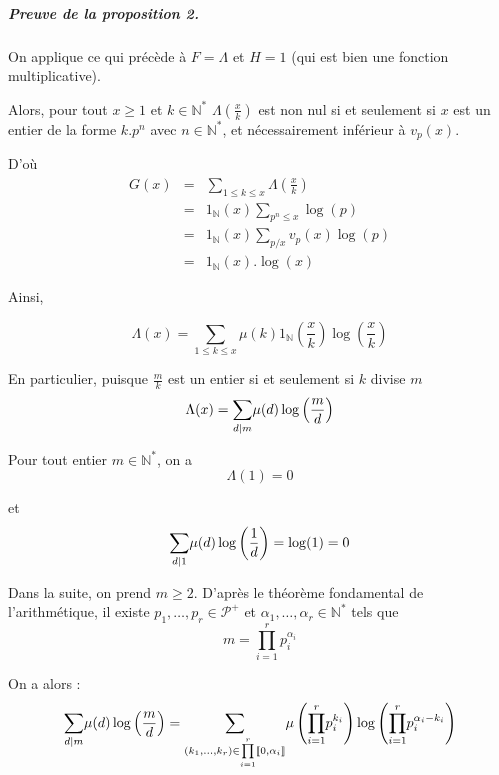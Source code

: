 \subparagraph{Preuve de la proposition 2.}


On applique ce qui pr{\'e}c{\`e}de {\`a} $F = \Lambda$ et $H = 1$ (qui est
bien une fonction multiplicative).

Alors, pour tout $x \geqslant 1$ et $k \in \mathbb{N}^{\ast}$ $\Lambda \left(
\frac{x}{k} \right)$ est non nul si et seulement si $x$ est un entier de la
forme $k.p^n$ avec $n \in \mathbb{N}^{\ast}$, et n{\'e}cessairement
inf{\'e}rieur {\`a} $v_p (x)$.

D'o{\`u}
\begin{eqnarray*}
  G (x) & = & \underset{1 \leqslant k \leqslant x}{\sum} \Lambda \left(
  \frac{x}{k} \right)\\
  & = & 1_{\mathbb{N}} (x) \underset{p^n \leqslant x}{\sum} \log (p)\\
  & = & 1_{\mathbb{N}} (x) \underset{p / x}{\sum} v_p (x) \log (p)\\
  & = & 1_{\mathbb{N}} (x) . \log (x)
\end{eqnarray*}


Ainsi,

\[  \]
\[ \Lambda (x) = \underset{1 \leqslant k \leqslant x}{\sum} \mu (k)
   1_{\mathbb{N}} \left( \frac{x}{k} \right) \log \left( \frac{x}{k} \right)
\]


En particulier, puisque $\frac{m}{k}$ est un entier si et seulement si $k$
divise $m$
\[ \Lambda (x) = \underset{d |  m}{\sum} \mu (d) \log \left(
   \frac{m}{d} \right) \]



Pour tout entier $m \in \mathbb{N}^{\ast}$, on a
\[ \Lambda (1) = 0 \]


et
\[ \underset{d |  1}{\sum} \mu (d) \log \left( \frac{1}{d} \right) =
   \log (1) = 0 \]


Dans la suite, on prend $m \geqslant 2$. D'apr{\`e}s le th{\'e}or{\`e}me
fondamental de l'arithm{\'e}tique, il existe $p_1, \ldots, p_r \in
\mathcal{P}^+$ et $\alpha_1, \ldots, \alpha_r \in \mathbb{N}^{\ast}$ tels que
\[ m = \underset{i = 1}{\overset{r}{\prod}} p^{\alpha_i}_i \]


On a alors :
\[ \underset{d |  m}{\sum} \mu (d) \log \left( \frac{m}{d} \right) =
   \underset{\underset{}{(k_1, \ldots, k_r) \in \underset{i =
   1}{\overset{r}{\prod}} \llbracket 0, \alpha_i \rrbracket}}{\sum} \mu \left(
   \underset{i = 1}{\overset{r}{\prod}} p^{k_i}_i \right) \log \left(
   \underset{i = 1}{\overset{r}{\prod}} p^{\alpha_i - k_i}_i \right) \]


